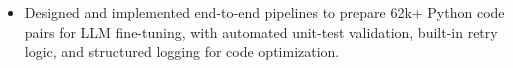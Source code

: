 \documentclass[10pt]{resume}
\begin{document}
\begin{itemize}

\item Designed and implemented end-to-end pipelines to prepare 62k+ Python code pairs for LLM fine-tuning, with automated unit-test validation, built-in retry logic, and structured logging for code optimization.


\end{itemize}
\end{document}
